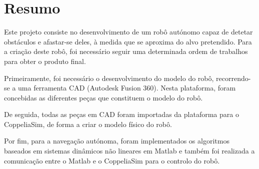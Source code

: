 \section{Resumo}
\label{sec:resumo}
%
Este projeto consiste no desenvolvimento de um robô autónomo capaz de detetar obstáculos e afastar-se deles, à medida que se aproxima do alvo pretendido. Para a criação deste robô, foi necessário seguir uma determinada ordem de trabalhos para obter o produto final. 

Primeiramente, foi necessário o desenvolvimento do modelo do robô, recorrendo-se a uma ferramenta CAD (Autodesk Fusion 360). Nesta plataforma, foram concebidas as diferentes peças que constituem o modelo do robô.  

De seguida, todas as peças em CAD foram importadas da plataforma para o CoppeliaSim, de forma a criar o modelo físico do robô.  

Por fim, para a navegação autónoma, foram implementados os algoritmos baseados em sistemas dinâmicos não lineares em Matlab e também foi realizada a comunicação entre o Matlab e o CoppeliaSim para o controlo do robô.